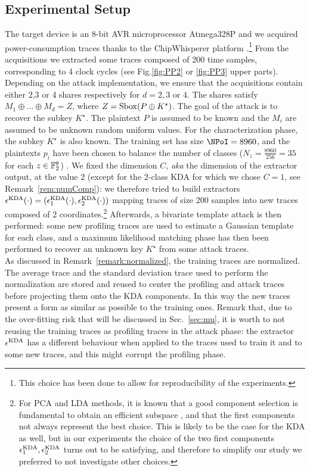 \subsection{Experimental Setup}
The target device is an 8-bit AVR microprocessor Atmega328P and we acquired power-consumption traces thanks to the ChipWhisperer platform \cite{o2014chipwhisperer}.\footnote{This choice has been done to allow for reproducibility of the experiments.} From the acquisitions we extracted some traces composed of 200 time samples, corresponding to 4 clock cycles (see Fig.\ref{fig:PP2} or \ref{fig:PP3} upper parts). Depending on the attack implementation, we ensure that the acquisitions contain either 2,3 or 4 shares respectively for $d=2,3$ or $4$. The shares satisfy $M_1 \oplus \dots \oplus M_d = Z$,
where $Z = \mathrm{Sbox}(P\oplus K^\star)$. The goal of the attack is to recover the subkey $K^\star$. The plaintext $P$ is assumed to be known and the $M_i$ are assumed to be unknown random uniform values. For the characterization phase, the subkey $K^\star$ is also known. The training set has size $\NPoI=8960$, and the plaintexts $p_i$ have been chosen to balance the number of classes ($N_z=\frac{8960}{256}=35$  for each $z\in \Bbb{F}_2^8$) . We fixed the dimension $C$, \emph{aka} the dimension of the extractor output,  at the value $2$ (except for the 2-class KDA for which we chose $C=1$, see Remark~\ref{rem:numComp}): we therefore tried to build extractors $\epsilon^{\mathrm{KDA}}(\cdot) = (\epsilon^{\mathrm{KDA}}_1(\cdot), \epsilon^{\mathrm{KDA}}_2(\cdot))$ mapping traces of size 200 samples into new traces composed of 2 coordinates.\footnote{For PCA and LDA methods, it is known that a good component selection is fundamental to obtain an efficient subspace \cite{Cagli2016}, and that the first components not always represent the best choice. This is likely to be the case for the KDA as well, but in our experiments the choice of the two first components $\epsilon^{\mathrm{KDA}}_1, \epsilon^{\mathrm{KDA}}_2$ turns out to be satisfying, and therefore to simplify our study we preferred to not investigate other choices.} Afterwards, a bivariate template attack \cite{Chari2003} is then performed: some new profiling traces are used to estimate a Gaussian template for each class, and a maximum likelihood matching phase has then been performed to recover an unknown key $K^\star$ from some attack traces. \\

As discussed in Remark~\ref{remark:normalized}, the training traces are normalized. The average trace and the standard deviation trace used to perform the normalization are stored and reused to center the profiling and attack traces before projecting them onto the KDA components. In this way the new traces present a form as similar as possible to the training ones. Remark that, due to the over-fitting risk that will be discussed in Sec.~\ref{sec:mu}, it is worth to not reusing the training traces as profiling traces in the attack phase: the extractor $\epsilon^{\mathrm{KDA}}$ has a different behaviour when applied to the traces used to train it and to some new traces, and this might corrupt the profiling phase.

